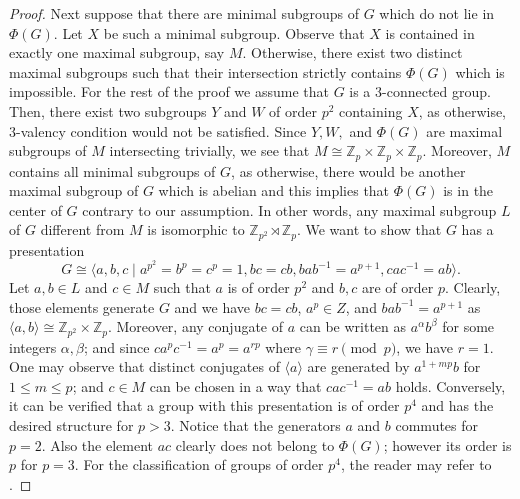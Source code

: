 \documentclass[a4paper,12pt]{article}
\theoremstyle{definition}
\theoremstyle{remark}
\theoremstyle{theorem}
\begin{document}
\begin{proof}
Next suppose that there are minimal subgroups of $G$ which do not lie in $\Phi(G)$. Let $X$ be such a minimal subgroup. Observe that $X$ is contained in exactly one maximal subgroup, say $M$. Otherwise, there exist two distinct maximal subgroups such that their intersection strictly contains $\Phi(G)$ which is impossible. For the rest of the proof we assume that $G$ is a $3$-connected group. Then, there exist two subgroups $Y$ and $W$ of order $p^2$ containing $X$, as otherwise,  $3$-valency condition would not be satisfied. Since $Y,W,$ and $\Phi(G)$ are maximal subgroups of $M$ intersecting trivially, we see that $M\cong \mathbb{Z}_p\times\mathbb{Z}_p\times\mathbb{Z}_p$. Moreover, $M$ contains all minimal subgroups of $G$, as otherwise, there would be another maximal subgroup of $G$ which is abelian and this implies that $\Phi(G)$ is in the center of $G$ contrary to our assumption. In other words, any maximal subgroup $L$ of $G$ different from $M$ is isomorphic to $\mathbb{Z}_{p^2}\rtimes\mathbb{Z}_p$. We want to show that $G$ has a presentation 
$$ G\cong \langle a,b,c\mid a^{p^2}=b^p=c^p=1, bc=cb, bab^{-1}=a^{p+1}, cac^{-1}=ab \rangle.  $$
Let $a,b\in L$ and $c\in M$ such that $a$ is of order $p^2$ and $b,c$ are of order $p$. Clearly, those elements generate $G$ and we have $bc=cb$, $a^p\in Z$, and $bab^{-1}=a^{p+1}$ as $\langle a,b\rangle\cong\mathbb{Z}_{p^2}\times\mathbb{Z}_p$. Moreover, any conjugate of $a$ can be written as $a^{\alpha}b^{\beta}$ for some integers $\alpha,\beta$; and since $ca^pc^{-1}=a^p=a^{rp}$ where $\gamma\equiv r \pmod{p}$, we have $r=1$. One may observe that distinct conjugates of $\langle a \rangle$ are generated by $a^{1+mp}b$ for $1\leq m\leq p$; and $c\in M$ can be chosen in a way that $cac^{-1}=ab$ holds. Conversely, it can be verified that a group with this presentation is of order $p^4$ and has the desired structure for $p>3$. Notice that the generators $a$ and $b$ commutes for $p=2$. Also the element $ac$ clearly does not belong to $\Phi(G)$; however its order is $p$ for $p=3$. For the classification of groups of order $p^4$, the reader may refer to \cite[p.~140]{Burnside1955}.

\end{proof}
\end{document}
